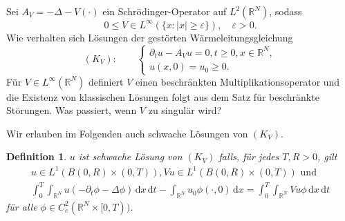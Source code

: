 \documentclass[handout]{beamer}
\newtheorem{df}[thm]{Definition}
\theoremstyle{break}
\begin{document}
\begin{frame}
Sei $A_V= -\Delta - V(\cdot)$ ein Schr\"odinger-Operator auf $L^2(\mathbb R^N)$, sodass
\begin{equation}
0\le V\in L^\infty(\{x:|x|\ge \varepsilon\}), \quad \varepsilon >0.
\end{equation}\label{perturbed}
\pause
Wie verhalten sich L\"osungen der gest\"orten W\"armeleitungsgleichung 
\begin{equation}
(K_V): \qquad \begin{cases}
\partial_t u - A_V u =0, t\ge 0, x\in \mathbb R^N,\\
u(x,0)=u_0 \ge 0.
\end{cases}
\end{equation}
\pause
F\"ur $V\in L^\infty(\mathbb R^N)$ definiert $V$ einen beschr\"ankten Multiplikationsoperator und die Existenz von klassischen L\"osungen folgt aus dem Satz f\"ur beschr\"ankte St\"orungen. %
Was passiert, wenn $V$ zu singul\"ar wird?
\end{frame}

\begin{frame}
Wir erlauben im Folgenden auch schwache L\"osungen von $(K_V)$. \vspace{.25cm}
\begin{df}
$u$ ist schwache L\"osung von $(K_V)$ falls, f\"ur jedes $T, R>0$, gilt
\begin{gather}\label{weak}
u\in L^1(B(0,R) \times (0,T)), Vu \in L^1(B(0,R)\times (0,T)) \text{ und }\\
\int_0^T \int_{\mathbb R^N} u (-\partial_t \phi - \Delta\phi) \, \mathrm dx \, \mathrm dt - \int_{\mathbb R^N} u_0 \phi(\cdot, 0) \, \mathrm dx = \int_0^T \int_{\mathbb R^N} V u \phi \, \mathrm dx \, \mathrm dt
\end{gather}
f\"ur alle $\phi \in C_c^2(\mathbb R^N\times [0,T))$.
\end{df}
\end{frame}
\end{document}
